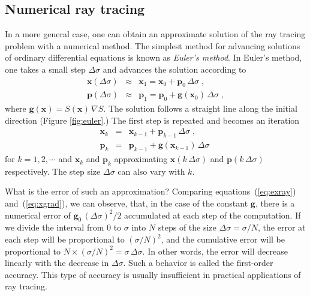 
\subsection{Numerical ray tracing}


In a more general case, one can obtain an approximate solution of the
ray tracing problem with a numerical method. The simplest method for
advancing solutions of ordinary differential equations is known as
\emph{Euler's method}. In Euler's method, one takes a small step
$\Delta \sigma$ and advances the solution according to
\begin{eqnarray}
  \label{eq:exray}
  \mathbf{x}(\Delta \sigma) & \approx & 
  \mathbf{x}_1 = \mathbf{x}_0 + \mathbf{p}_0\,\Delta \sigma\;, \\
  \label{eq:epray}
  \mathbf{p}(\Delta \sigma) & \approx &
  \mathbf{p}_1 = \mathbf{p}_0 + \mathbf{g}(\mathbf{x}_0)\,\Delta \sigma\;,
\end{eqnarray}
where $\mathbf{g}(\mathbf{x}) = S(\mathbf{x})\,\nabla S$.  The solution
follows a straight line along the initial direction (Figure \ref{fig:euler}.)
The first step is repeated and becomes an iteration
\begin{eqnarray}
  \label{eq:exrayk}
  \mathbf{x}_k & = & \mathbf{x}_{k-1} + \mathbf{p}_{k-1}\,\Delta \sigma\;, \\
  \label{eq:eprayk}
  \mathbf{p}_k & = & \mathbf{p}_{k-1} + \mathbf{g}(\mathbf{x}_{k-1})\,\Delta \sigma\;
\end{eqnarray}
for $k=1,2,\cdots$ and $\mathbf{x}_k$ and $\mathbf{p}_k$ approximating
$\mathbf{x}(k\,\Delta \sigma)$ and $\mathbf{p}(k\,\Delta \sigma)$
respectively. The step size $\Delta \sigma$ can also vary with $k$.


What is the error of such an approximation? Comparing
equations~(\ref{eq:exray}) and~(\ref{eq:xgrad}), we can observe, that,
in the case of the constant $\mathbf{g}$, there is a numerical error
of $\mathbf{g}_0\,(\Delta \sigma)^2/2$ accumulated at each step of the
computation. If we divide the interval from $0$ to $\sigma$ into $N$
steps of the size $\Delta \sigma = \sigma/N$, the error at each step
will be proportional to $(\sigma/N)^2$, and the cumulative error will
be proportional to $N \times (\sigma/N)^2 = \sigma\,\Delta \sigma$. In
other words, the error will decrease linearly with the decrease in
$\Delta \sigma$. Such a behavior is called the first-order
accuracy. This type of accuracy is usually insufficient in
practical applications of ray tracing.

